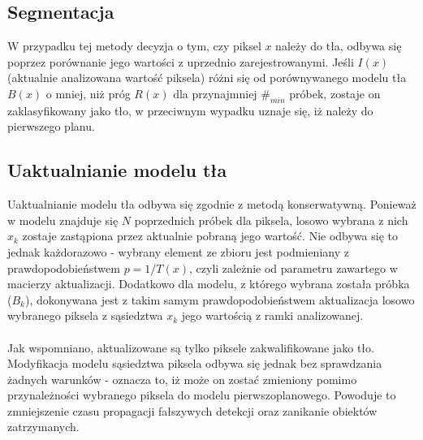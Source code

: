 \subsection{Segmentacja}
W przypadku tej metody decyzja o tym, czy piksel $x$ należy do tła, odbywa się poprzez porównanie jego wartości z uprzednio zarejestrowanymi. Jeśli $I(x)$ (aktualnie analizowana wartość piksela) różni się od porównywanego modelu tła $B(x)$ o mniej, niż próg $R(x)$ dla przynajmniej $\#_{min}$ próbek, zostaje on zaklasyfikowany jako tło, w przeciwnym wypadku uznaje się, iż należy do pierwszego planu.
\subsection{Uaktualnianie modelu tła}
Uaktualnianie modelu tła odbywa się zgodnie z metodą konserwatywną. Ponieważ w modelu znajduje się $N$ poprzednich próbek dla piksela, losowo wybrana z nich $x_{k}$ zostaje zastąpiona przez aktualnie pobraną jego wartość. Nie odbywa się to jednak każdorazowo - wybrany element ze zbioru jest podmieniany z prawdopodobieństwem $p = 1/T(x)$, czyli zależnie od parametru zawartego w macierzy aktualizacji. Dodatkowo dla modelu, z którego wybrana została próbka ($B_{k}$), dokonywana jest z takim samym prawdopodobieństwem aktualizacja losowo wybranego piksela z sąsiedztwa $x_{k}$ jego wartością z ramki analizowanej.
\paragraph{}
Jak wspomniano, aktualizowane są tylko piksele zakwalifikowane jako tło. Modyfikacja modelu sąsiedztwa piksela odbywa się jednak bez sprawdzania żadnych warunków - oznacza to, iż może on zostać zmieniony pomimo przynależności wybranego piksela do modelu pierwszoplanowego. Powoduje to zmniejszenie czasu propagacji fałszywych detekcji oraz zanikanie obiektów zatrzymanych.
